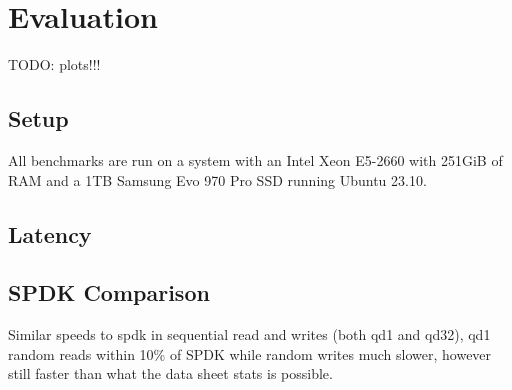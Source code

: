 \chapter{Evaluation}
TODO: plots!!!

\section{Setup}
All benchmarks are run on a system with an Intel Xeon E5-2660 with 251GiB of RAM and a 1TB Samsung Evo 970 Pro SSD running Ubuntu 23.10.

\section{Latency}

\section{SPDK Comparison}
Similar speeds to spdk in sequential read and writes (both qd1 and qd32), qd1 random reads within 10\% of SPDK while random writes much slower, however still faster than what the data sheet stats is possible.
